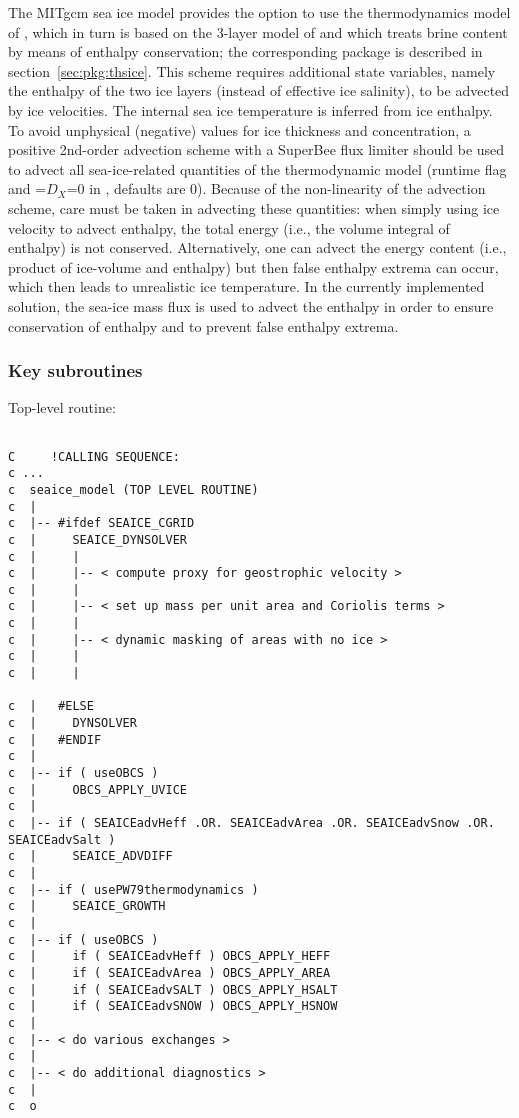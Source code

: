 The MITgcm sea ice model provides the option to use
the thermodynamics model of \citet{win00}, which in turn is based on
the 3-layer model of \citet{sem76} and which treats brine content by
means of enthalpy conservation; the corresponding package
 is described in section~\ref{sec:pkg:thsice}. This
scheme requires additional state variables, namely the enthalpy of the
two ice layers (instead of effective ice salinity), to be advected by
ice velocities.
%
The internal sea ice temperature is inferred from ice enthalpy.  To
avoid unphysical (negative) values for ice thickness and
concentration, a positive 2nd-order advection scheme with a SuperBee
flux limiter \citep{roe:85} should be used to advect all
sea-ice-related quantities of the \citet{win00} thermodynamic model
(runtime flag  and
=$D_{X}$=0 in , defaults are 0).  Because of the
non-linearity of the advection scheme, care must be taken in advecting
these quantities: when simply using ice velocity to advect enthalpy,
the total energy (i.e., the volume integral of enthalpy) is not
conserved. Alternatively, one can advect the energy content (i.e.,
product of ice-volume and enthalpy) but then false enthalpy extrema
can occur, which then leads to unrealistic ice temperature.  In the
currently implemented solution, the sea-ice mass flux is used to
advect the enthalpy in order to ensure conservation of enthalpy and to
prevent false enthalpy extrema. %


\subsubsection{Key subroutines
\label{sec:pkg:seaice:subroutines}}

Top-level routine: 

{\footnotesize
\begin{verbatim}

C     !CALLING SEQUENCE:
c ...
c  seaice_model (TOP LEVEL ROUTINE)
c  |
c  |-- #ifdef SEAICE_CGRID
c  |     SEAICE_DYNSOLVER
c  |     |
c  |     |-- < compute proxy for geostrophic velocity >
c  |     |
c  |     |-- < set up mass per unit area and Coriolis terms >
c  |     |
c  |     |-- < dynamic masking of areas with no ice >
c  |     |
c  |     |

c  |   #ELSE
c  |     DYNSOLVER
c  |   #ENDIF
c  |
c  |-- if ( useOBCS ) 
c  |     OBCS_APPLY_UVICE
c  |
c  |-- if ( SEAICEadvHeff .OR. SEAICEadvArea .OR. SEAICEadvSnow .OR. SEAICEadvSalt )
c  |     SEAICE_ADVDIFF
c  |
c  |-- if ( usePW79thermodynamics ) 
c  |     SEAICE_GROWTH
c  |
c  |-- if ( useOBCS ) 
c  |     if ( SEAICEadvHeff ) OBCS_APPLY_HEFF
c  |     if ( SEAICEadvArea ) OBCS_APPLY_AREA
c  |     if ( SEAICEadvSALT ) OBCS_APPLY_HSALT
c  |     if ( SEAICEadvSNOW ) OBCS_APPLY_HSNOW
c  |
c  |-- < do various exchanges >
c  |
c  |-- < do additional diagnostics >
c  |
c  o

\end{verbatim}
}



